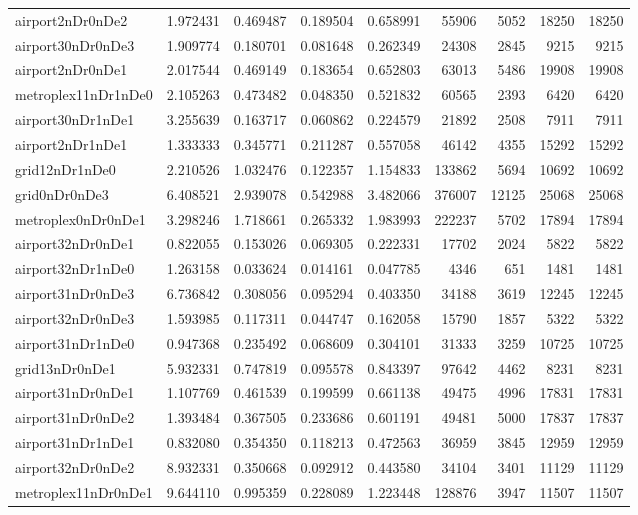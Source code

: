 \begin{longtable}{|l|r|r|r|r|r|r|r|r|}
airport2nDr0nDe2 & 1.972431 & 0.469487 & 0.189504 & 0.658991 & 55906 & 5052 & 18250 & 18250 \\
airport30nDr0nDe3 & 1.909774 & 0.180701 & 0.081648 & 0.262349 & 24308 & 2845 & 9215 & 9215 \\
airport2nDr0nDe1 & 2.017544 & 0.469149 & 0.183654 & 0.652803 & 63013 & 5486 & 19908 & 19908 \\
metroplex11nDr1nDe0 & 2.105263 & 0.473482 & 0.048350 & 0.521832 & 60565 & 2393 & 6420 & 6420 \\
airport30nDr1nDe1 & 3.255639 & 0.163717 & 0.060862 & 0.224579 & 21892 & 2508 & 7911 & 7911 \\
airport2nDr1nDe1 & 1.333333 & 0.345771 & 0.211287 & 0.557058 & 46142 & 4355 & 15292 & 15292 \\
grid12nDr1nDe0 & 2.210526 & 1.032476 & 0.122357 & 1.154833 & 133862 & 5694 & 10692 & 10692 \\
grid0nDr0nDe3 & 6.408521 & 2.939078 & 0.542988 & 3.482066 & 376007 & 12125 & 25068 & 25068 \\
metroplex0nDr0nDe1 & 3.298246 & 1.718661 & 0.265332 & 1.983993 & 222237 & 5702 & 17894 & 17894 \\
airport32nDr0nDe1 & 0.822055 & 0.153026 & 0.069305 & 0.222331 & 17702 & 2024 & 5822 & 5822 \\
airport32nDr1nDe0 & 1.263158 & 0.033624 & 0.014161 & 0.047785 & 4346 & 651 & 1481 & 1481 \\
airport31nDr0nDe3 & 6.736842 & 0.308056 & 0.095294 & 0.403350 & 34188 & 3619 & 12245 & 12245 \\
airport32nDr0nDe3 & 1.593985 & 0.117311 & 0.044747 & 0.162058 & 15790 & 1857 & 5322 & 5322 \\
airport31nDr1nDe0 & 0.947368 & 0.235492 & 0.068609 & 0.304101 & 31333 & 3259 & 10725 & 10725 \\
grid13nDr0nDe1 & 5.932331 & 0.747819 & 0.095578 & 0.843397 & 97642 & 4462 & 8231 & 8231 \\
airport31nDr0nDe1 & 1.107769 & 0.461539 & 0.199599 & 0.661138 & 49475 & 4996 & 17831 & 17831 \\
airport31nDr0nDe2 & 1.393484 & 0.367505 & 0.233686 & 0.601191 & 49481 & 5000 & 17837 & 17837 \\
airport31nDr1nDe1 & 0.832080 & 0.354350 & 0.118213 & 0.472563 & 36959 & 3845 & 12959 & 12959 \\
airport32nDr0nDe2 & 8.932331 & 0.350668 & 0.092912 & 0.443580 & 34104 & 3401 & 11129 & 11129 \\
metroplex11nDr0nDe1 & 9.644110 & 0.995359 & 0.228089 & 1.223448 & 128876 & 3947 & 11507 & 11507 \\

\end{longtable}
